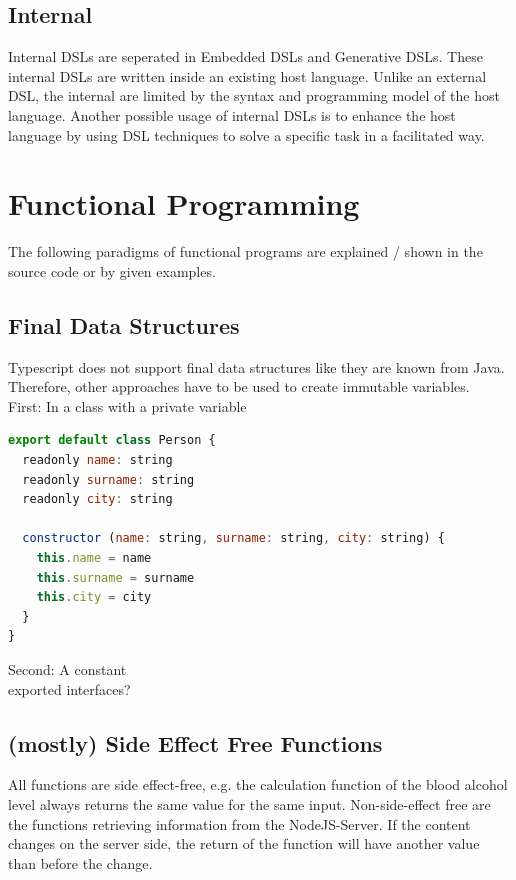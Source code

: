 \documentclass[12pt]{article}
\begin{document}
\subsection{Internal}
Internal DSLs are seperated in Embedded DSLs and Generative DSLs. These internal DSLs are written inside an existing host language. Unlike an external DSL, the internal are limited by the syntax and programming model of the host language. Another possible usage of internal DSLs is to enhance the host language by using DSL techniques to solve a specific task in a facilitated way.


\section{Functional Programming}

The following paradigms of functional programs are explained / shown in the source code or by given examples.

\subsection{Final Data Structures}

Typescript does not support final data structures like they are known from Java. Therefore, other approaches have to be used to create immutable variables.\\
First: 	In a class with a private variable\\
\begin{lstlisting}[language=javascript]
export default class Person {
  readonly name: string
  readonly surname: string
  readonly city: string
    
  constructor (name: string, surname: string, city: string) {
    this.name = name
    this.surname = surname
    this.city = city
  }
}
\end{lstlisting}
Second:	A constant\\
exported interfaces?
\subsection{(mostly) Side Effect Free Functions}

All functions are side effect-free, e.g. the calculation function of the blood alcohol level always returns the same value for the same input. Non-side-effect free are the functions retrieving information from the NodeJS-Server. If the content changes on the server side, the return of the function will have another value than before the change.
\end{document}
